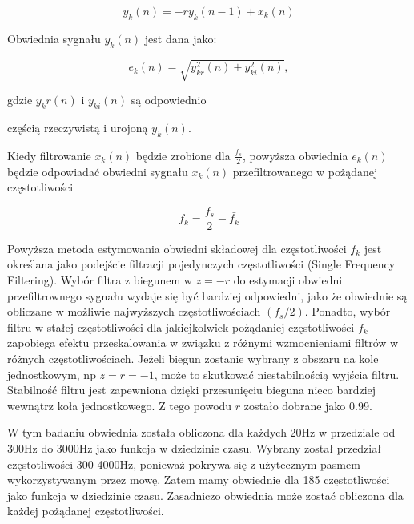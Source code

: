 \documentclass[eng,printmode]{mgr}
\begin{document}
 \begin{equation}
	 y_{k}(n) = -r y_{k}(n-1)+x_{k}(n)
 \end{equation}
 
  Obwiednia sygnału $y_{k}(n)$ jest dana jako:
 
  \begin{equation}
  	e_{k}(n) = \sqrt{y_{kr}^2(n) + y_{ki}^2(n)},
  \end{equation} 
  
  \hspace{8cm}gdzie $y_kr(n)$ i $y_{ki}(n)$ są odpowiednio 
  
  \hspace{8cm}częścią rzeczywistą i urojoną $y_{k}(n)$.\vspace{5mm}
  
  Kiedy filtrowanie $x_{k}(n)$ będzie zrobione dla $\frac{f_{s}}{2}$, powyższa obwiednia $e_{k}(n)$ będzie odpowiadać obwiedni sygnału $x_{k}(n)$ przefiltrowanego w pożądanej częstotliwości
  
  \begin{equation}
  	f_{k} = \frac{f_{s}}{2} - \bar{f_{k}}
  \end{equation}
  
  Powyższa metoda estymowania obwiedni składowej dla częstotliwości $f_{k}$ jest określana jako podejście filtracji pojedynczych częstotliwości (Single Frequency Filtering). Wybór filtra z biegunem w $z=-r$ do estymacji obwiedni przefiltrownego sygnału wydaje się być bardziej odpowiedni, jako że obwiednie są obliczane w możliwie najwyższych częstotliwościach $(f_{s}/2)$. Ponadto, wybór filtru w stałej częstotliwości dla jakiejkolwiek pożądaniej częstotliwości $f_{k}$ zapobiega efektu przeskalowania w związku z różnymi wzmocnieniami filtrów w różnych częstotliwościach. Jeżeli biegun zostanie wybrany z obszaru na kole jednostkowym, np $z=r=-1$, może to skutkować niestabilnością wyjścia filtru. Stabilność filtru jest zapewniona dzięki przesunięciu bieguna nieco bardziej wewnątrz koła jednostkowego. Z tego powodu $r$ zostało dobrane jako 0.99.
  
  W tym badaniu obwiednia została obliczona dla każdych 20Hz w przedziale od 300Hz do 3000Hz jako funkcja w dziedzinie czasu. Wybrany został przedział częstotliwości 300-4000Hz, ponieważ pokrywa się z użytecznym pasmem wykorzystywanym przez mowę. Zatem mamy obwiednie dla 185 częstotliwości jako funkcja w dziedzinie czasu. Zasadniczo obwiednia może zostać obliczona dla każdej pożądanej częstotliwości.
  
\end{document}
